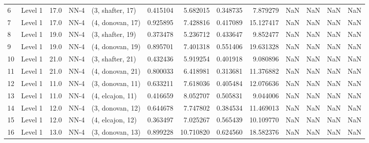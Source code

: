 \begin{tabular}{llrllrrrrrrrr}
6  &   Level 1 &   17.0 &        NN-4 &  (3, shafter, 17) &   0.415104 &   5.682015 &  0.348735 &   7.879279 &                  NaN &                    NaN &                 NaN &                   NaN \\
7  &   Level 1 &   17.0 &        NN-4 &  (4, donovan, 17) &   0.925895 &   7.428816 &  0.417089 &  15.127417 &                  NaN &                    NaN &                 NaN &                   NaN \\
8  &   Level 1 &   19.0 &        NN-4 &  (3, shafter, 19) &   0.373478 &   5.236712 &  0.433647 &   9.852477 &                  NaN &                    NaN &                 NaN &                   NaN \\
9  &   Level 1 &   19.0 &        NN-4 &  (4, donovan, 19) &   0.895701 &   7.401318 &  0.551406 &  19.631328 &                  NaN &                    NaN &                 NaN &                   NaN \\
10 &   Level 1 &   21.0 &        NN-4 &  (3, shafter, 21) &   0.432436 &   5.919254 &  0.401918 &   9.080896 &                  NaN &                    NaN &                 NaN &                   NaN \\
11 &   Level 1 &   21.0 &        NN-4 &  (4, donovan, 21) &   0.800033 &   6.418981 &  0.313681 &  11.376882 &                  NaN &                    NaN &                 NaN &                   NaN \\
12 &   Level 1 &   11.0 &        NN-4 &  (3, donovan, 11) &   0.633211 &   7.618036 &  0.405484 &  12.076636 &                  NaN &                    NaN &                 NaN &                   NaN \\
13 &   Level 1 &   11.0 &        NN-4 &  (4, elcajon, 11) &   0.416659 &   8.052707 &  0.505831 &   9.044006 &                  NaN &                    NaN &                 NaN &                   NaN \\
14 &   Level 1 &   12.0 &        NN-4 &  (3, donovan, 12) &   0.644678 &   7.747802 &  0.384534 &  11.469013 &                  NaN &                    NaN &                 NaN &                   NaN \\
15 &   Level 1 &   12.0 &        NN-4 &  (4, elcajon, 12) &   0.363497 &   7.025267 &  0.565439 &  10.109770 &                  NaN &                    NaN &                 NaN &                   NaN \\
16 &   Level 1 &   13.0 &        NN-4 &  (3, donovan, 13) &   0.899228 &  10.710820 &  0.624560 &  18.582376 &                  NaN &                    NaN &                 NaN &                   NaN \\

\end{tabular}
